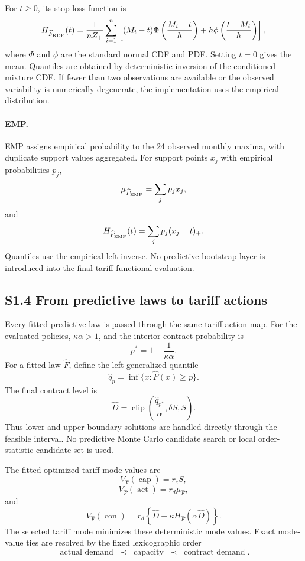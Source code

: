 \documentclass[]{interact}
\begin{document}
For \(t\geq0\), its stop-loss function is
\[
H_{\widehat F_{\rm KDE}}(t)
=
\frac{1}{nZ_+}
\sum_{i=1}^{n}
\left[
(M_i-t)
\Phi\left(\frac{M_i-t}{h}\right)
+
h\phi\left(\frac{t-M_i}{h}\right)
\right],
\]
where \(\Phi\) and \(\phi\) are the standard normal CDF and PDF.
Setting \(t=0\) gives the mean. Quantiles are obtained by deterministic
inversion of the conditioned mixture CDF. If fewer than two
observations are available or the observed variability is numerically
degenerate, the implementation uses the empirical distribution.


\paragraph*{EMP.}

EMP assigns empirical probability to the 24 observed monthly maxima,
with duplicate support values aggregated. For support points \(x_j\)
with empirical probabilities \(p_j\),
\[
\mu_{\widehat F_{\rm EMP}}
=
\sum_jp_jx_j,
\]
and
\[
H_{\widehat F_{\rm EMP}}(t)
=
\sum_jp_j(x_j-t)_+.
\]
Quantiles use the empirical left inverse. No predictive-bootstrap layer
is introduced into the final tariff-functional evaluation.



\subsection*{S1.4 From predictive laws to tariff actions}

Every fitted predictive law is passed through the same tariff-action
map. For the evaluated policies, \(\kappa\alpha>1\), and the interior
contract probability is
\[
p^\ast
=
1-\frac{1}{\kappa\alpha}.
\]
For a fitted law \(\widehat F\), define the left generalized quantile
\[
\widehat q_p
=
\inf\{x:\widehat F(x)\geq p\}.
\]
The final contract level is
\[
\widehat D
=
\operatorname{clip}
\left(
\frac{\widehat q_{p^\ast}}{\alpha},
\delta S,
S
\right).
\]
Thus lower and upper boundary solutions are handled directly through
the feasible interval. No predictive Monte Carlo candidate search or
local order-statistic candidate set is used.

The fitted optimized tariff-mode values are
\[
V_{\widehat F}(\operatorname{cap})
=
r_cS,
\]
\[
V_{\widehat F}(\operatorname{act})
=
r_d\mu_{\widehat F},
\]
and
\[
V_{\widehat F}(\operatorname{con})
=
r_d
\left\{
\widehat D
+
\kappa
H_{\widehat F}(\alpha\widehat D)
\right\}.
\]
The selected tariff mode minimizes these deterministic mode values.
Exact mode-value ties are resolved by the fixed lexicographic order
\[
\operatorname{actual\ demand}
\;\prec\;
\operatorname{capacity}
\;\prec\;
\operatorname{contract\ demand}.
\]
\end{document}
